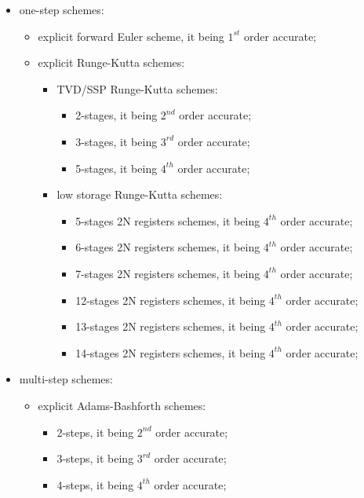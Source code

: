 \documentclass[pdftex,preprint,3p,times,numbers]{elsarticle}
\begin{document}
\begin{itemize}
  \item one-step schemes:
    \begin{itemize}
      \item explicit forward Euler scheme, it being $1^{st}$ order accurate;
      \item explicit Runge-Kutta schemes:
        \begin{itemize}
          \item TVD/SSP Runge-Kutta schemes:
            \begin{itemize}
              \item 2-stages, it being $2^{nd}$ order accurate;
              \item 3-stages, it being $3^{rd}$ order accurate;
              \item 5-stages, it being $4^{th}$ order accurate;
              \end{itemize}
          \item low storage Runge-Kutta schemes:
            \begin{itemize}
              \item 5-stages 2N registers schemes, it being $4^{th}$ order accurate;
              \item 6-stages 2N registers schemes, it being $4^{th}$ order accurate;
              \item 7-stages 2N registers schemes, it being $4^{th}$ order accurate;
              \item 12-stages 2N registers schemes, it being $4^{th}$ order accurate;
              \item 13-stages 2N registers schemes, it being $4^{th}$ order accurate;
              \item 14-stages 2N registers schemes, it being $4^{th}$ order accurate;
              \end{itemize}
          \end{itemize}
      \end{itemize}
  \item multi-step schemes:
    \begin{itemize}
      \item explicit Adams-Bashforth schemes:
        \begin{itemize}
          \item 2-steps, it being $2^{nd}$ order accurate;
          \item 3-steps, it being $3^{rd}$ order accurate;
          \item 4-steps, it being $4^{th}$ order accurate;

\end{itemize}
\end{itemize}
\end{itemize}
\end{document}
